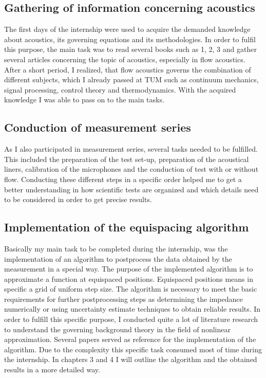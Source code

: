 \documentclass[11pt]{report} %
\begin{document}
\subsection{Gathering of information concerning acoustics } 
The first days of the internship were used to acquire the demanded knowledge about acoustics, its governing equations and its methodologies.
In order to fulfil this purpose, the main task was to read several books such as 1, 2, 3 and gather several articles concerning the topic of acoustics, especially in flow acoustics. 
After a short period, I realized, that flow acoustics governs the combination of different subjects, which I already passed at TUM such as continuum mechanics, signal processing, control theory and thermodynamics.
With the acquired knowledge I was able to pass on to the main tasks. 

\subsection{Conduction of measurement series}
As I also participated in measurement series, several tasks needed to be fulfilled.
This included the preparation of the test set-up, preparation of the acoustical liners, calibration of the microphones and the conduction of test with or without flow.
Conducting these different steps in a specific order helped me to get a better understanding in how scientific tests are organized and which details need to be considered in order to get precise results. 

\subsection{Implementation of the equispacing algorithm}
Basically my main task to be completed during the internship, was the implementation of an algorithm to postprocess the data obtained by the measurement in a special way. 
The purpose of the implemented algorithm is to approximate a function at equispaced positions. 
Equispaced positions means in specific a grid of uniform step size. 
The algorithm is necessary to meet the basic requirements for further postprocessing steps as determining the impedance numerically or using uncertainty estimate techniques to obtain reliable results.  
In order to fulfill this specific purpose, I conducted quite a lot of literature research to understand the governing background theory in the field of nonlinear approximation.
Several papers served as reference for the implementation of the algorithm. 
Due to the complexity this specific task consumed most of time during the internship.
In chapters 3 and 4 I will outline the algorithm and the obtained results in a more detailed way.
 
\end{document}
